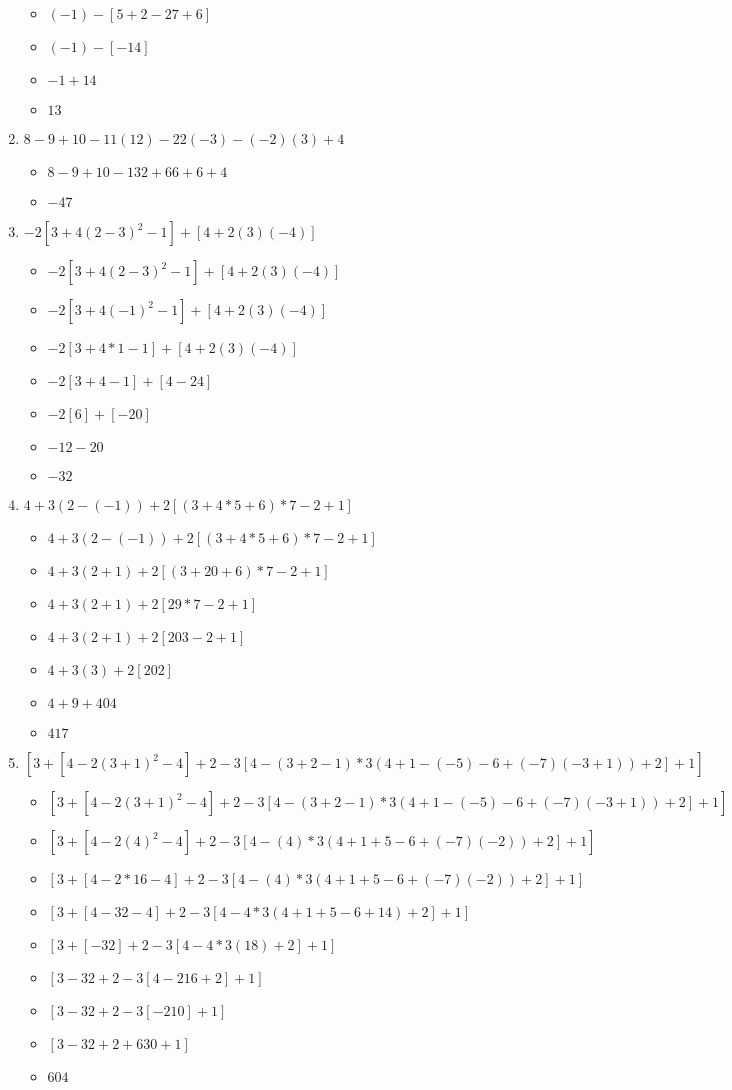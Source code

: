\documentclass{article}
\begin{document}
\begin{enumerate}
\begin{itemize}
  \item $(-1)-[5+2-27+6]$
  \item $(-1)-[-14]$
  \item $-1+14$
  \item $13$
  \end{itemize}
\item $8-9+10-11(12)-22(-3)-(-2)(3)+4$
  \begin{itemize}
  \item $8-9+10-132+66+6+4$
  \item $-47$
  \end{itemize}
\item $-2[3+4(2-3)^{2}-1]+[4+2(3)(-4)]$
  \begin{itemize}
  \item $-2[3+4(2-3)^{2}-1]+[4+2(3)(-4)]$
  \item $-2[3+4(-1)^{2}-1]+[4+2(3)(-4)]$
  \item $-2[3+4*1-1]+[4+2(3)(-4)]$
  \item $-2[3+4-1]+[4-24]$
  \item $-2[6]+[-20]$
  \item $-12-20$
  \item $-32$
  \end{itemize}
\item $4+3(2-(-1))+2[(3+4*5+6)*7-2+1]$
  \begin{itemize}
  \item $4+3(2-(-1))+2[(3+4*5+6)*7-2+1]$
  \item $4+3(2+1)+2[(3+20+6)*7-2+1]$
  \item $4+3(2+1)+2[29*7-2+1]$
  \item $4+3(2+1)+2[203-2+1]$
  \item $4+3(3)+2[202]$
  \item $4+9+404$
  \item $417$
  \end{itemize}
\item $[3+[4-2(3+1)^{2}-4]+2-3[4-(3+2-1)*3(4+1-(-5)-6+(-7)(-3+1))+2]+1]$
  \begin{itemize}
  \item $[3+[4-2(3+1)^{2}-4]+2-3[4-(3+2-1)*3(4+1-(-5)-6+(-7)(-3+1))+2]+1]$
  \item $[3+[4-2(4)^{2}-4]+2-3[4-(4)*3(4+1+5-6+(-7)(-2))+2]+1]$
  \item $[3+[4-2*16-4]+2-3[4-(4)*3(4+1+5-6+(-7)(-2))+2]+1]$
  \item $[3+[4-32-4]+2-3[4-4*3(4+1+5-6+14)+2]+1]$
  \item $[3+[-32]+2-3[4-4*3(18)+2]+1]$
  \item $[3-32+2-3[4-216+2]+1]$
  \item $[3-32+2-3[-210]+1]$
  \item $[3-32+2+630+1]$
  \item $604$
  \end{itemize}
\end{enumerate}
\end{document}
